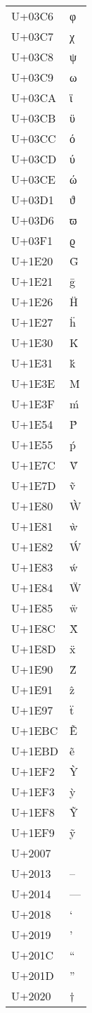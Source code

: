 \documentclass{article}
\begin{document}
\begin{longtable}{ll}
U+03C6 & φ \\
U+03C7 & χ \\
U+03C8 & ψ \\
U+03C9 & ω \\
U+03CA & ϊ \\
U+03CB & ϋ \\
U+03CC & ό \\
U+03CD & ύ \\
U+03CE & ώ \\
U+03D1 & ϑ \\
U+03D6 & ϖ \\
U+03F1 & ϱ \\
U+1E20 & Ḡ \\
U+1E21 & ḡ \\
U+1E26 & Ḧ \\
U+1E27 & ḧ \\
U+1E30 & Ḱ \\
U+1E31 & ḱ \\
U+1E3E & Ḿ \\
U+1E3F & ḿ \\
U+1E54 & Ṕ \\
U+1E55 & ṕ \\
U+1E7C & Ṽ \\
U+1E7D & ṽ \\
U+1E80 & Ẁ \\
U+1E81 & ẁ \\
U+1E82 & Ẃ \\
U+1E83 & ẃ \\
U+1E84 & Ẅ \\
U+1E85 & ẅ \\
U+1E8C & Ẍ \\
U+1E8D & ẍ \\
U+1E90 & Ẑ \\
U+1E91 & ẑ \\
U+1E97 & ẗ \\
U+1EBC & Ẽ \\
U+1EBD & ẽ \\
U+1EF2 & Ỳ \\
U+1EF3 & ỳ \\
U+1EF8 & Ỹ \\
U+1EF9 & ỹ \\
U+2007 &   \\
U+2013 & – \\
U+2014 & — \\
U+2018 & ‘ \\
U+2019 & ’ \\
U+201C & “ \\
U+201D & ” \\
U+2020 & † \\

\end{longtable}
\end{document}
